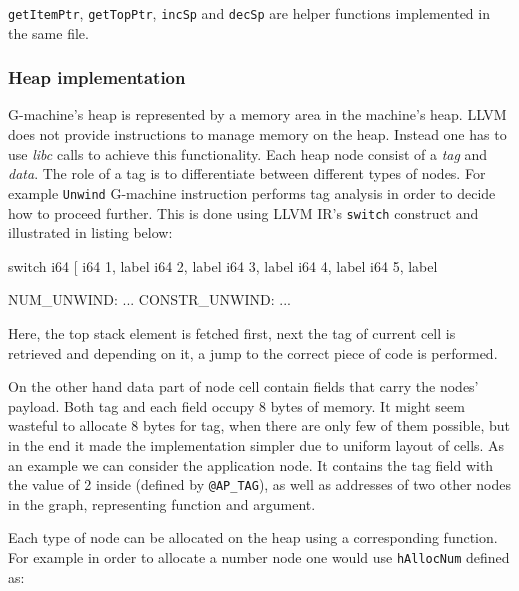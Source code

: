 \documentclass[12pt,a4paper]{report}
\begin{document}
\texttt{getItemPtr}, \texttt{getTopPtr}, \texttt{incSp} and \texttt{decSp} are
helper functions implemented in the same file.


\subsubsection{Heap implementation}
G-machine's heap is represented by a memory area in the machine's heap. LLVM
does not provide instructions to manage memory on the heap. Instead one has to
use \textit{libc} calls to achieve this functionality. Each heap node consist
of a \textit{tag} and \textit{data}. The role of a tag is to differentiate
between different types of nodes. For example \texttt{Unwind} G-machine
instruction performs tag analysis in order to decide how to proceed further.
This is done using LLVM IR's \texttt{switch} construct and illustrated in
listing below:

\vspace*{0.2in}
\begin{code}[style=assembler]

switch i64 %
    [ i64 1, label %
      i64 2, label %
      i64 3, label %
      i64 4, label %
      i64 5, label %

NUM_UNWIND:
...
CONSTR_UNWIND:
...
\end{code}

Here, the top stack element is fetched first, next the tag of current cell is
retrieved and depending on it, a jump to the correct piece of code is
performed.

On the other hand data part of node cell contain fields that carry the nodes'
payload. Both tag and each field occupy 8 bytes of memory. It might seem
wasteful to allocate 8 bytes for tag, when there are only few of them possible,
but in the end it made the implementation simpler due to uniform layout of
cells. As an example we can consider the application node. It contains the tag
field with the value of 2 inside (defined by \texttt{@AP\_TAG}), as well as
addresses of two other nodes in the graph, representing function and argument.

Each type of node can be allocated on the heap using a corresponding function.
For example in order to allocate a number node one would use \texttt{hAllocNum}
defined as:

\vspace*{0.2in}
\end{document}
